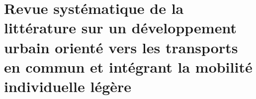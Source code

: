 
\chapter
{Revue systématique de la littérature sur un développement urbain orienté vers les transports en commun et intégrant la mobilité individuelle légère
    \label{chap2:titre}
    }
    \begin{refsegment}



\end{refsegment}
